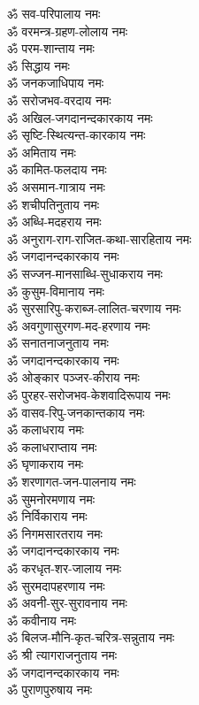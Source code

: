 \begin{flushleft}
\begin{multicols}{2}
ॐ सव-परिपालाय नमः\hfill{}\\
ॐ वरमन्त्र-ग्रहण-लोलाय नमः\\
ॐ परम-शान्ताय नमः\\
ॐ सिद्धाय नमः\\
ॐ जनकजाधिपाय नमः\\
ॐ सरोजभव-वरदाय नमः\\
ॐ अखिल-जगदानन्दकारकाय नमः\\
ॐ सृष्टि-स्थित्यन्त-कारकाय नमः\\
ॐ अमिताय नमः\\
ॐ कामित-फलदाय नमः\\
ॐ असमान-गात्राय नमः\hfill{}\\
ॐ शचीपतिनुताय नमः\\
ॐ अब्धि-मदहराय नमः\\
ॐ अनुराग-राग-राजित-कथा-सारहिताय नमः\\
ॐ जगदानन्दकारकाय नमः\\
ॐ सज्जन-मानसाब्धि-सुधाकराय नमः\\
ॐ कुसुम-विमानाय नमः\\
ॐ सुरसारिपु-कराब्ज-लालित-चरणाय नमः\\
ॐ अवगुणासुरगण-मद-हरणाय  नमः\\
ॐ सनातनाजनुताय नमः\\
ॐ जगदानन्दकारकाय नमः\hfill{}\\
ॐ ओङ्कार पञ्जर-कीराय नमः\\
ॐ पुरहर-सरोजभव-केशवादिरूपाय नमः\\
ॐ वासव-रिपु-जनकान्तकाय नमः\\
ॐ कलाधराय नमः\\
ॐ कलाधराप्ताय नमः\\
ॐ घृणाकराय नमः\\
ॐ शरणागत-जन-पालनाय नमः\\
ॐ सुमनोरमणाय नमः\\
ॐ निर्विकाराय नमः\\
ॐ निगमसारतराय नमः\hfill{}\\
ॐ जगदानन्दकारकाय नमः\\
ॐ करधृत-शर-जालाय  नमः\\
ॐ सुरमदापहरणाय नमः\\
ॐ अवनी-सुर-सुरावनाय नमः\\
ॐ कवीनाय  नमः\\
ॐ बिलज-मौनि-कृत-चरित्र-सन्नुताय नमः\\
ॐ श्री त्यागराजनुताय नमः\\
ॐ जगदानन्दकारकाय नमः\\
ॐ पुराणपुरुषाय नमः\\

\end{multicols}
\end{flushleft}
